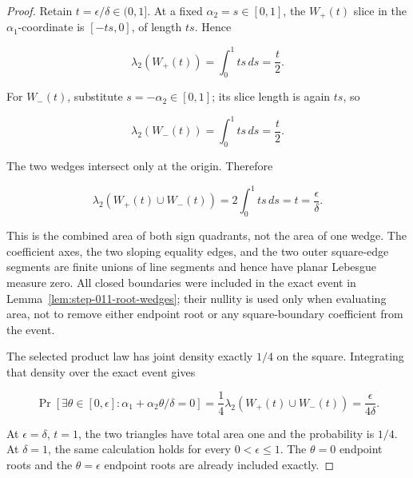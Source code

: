 \begin{proof}
Retain \(t=\epsilon/\delta\in(0,1]\). At a fixed
\(\alpha_2=s\in[0,1]\), the \(W_+(t)\) slice in the \(\alpha_1\)-coordinate is
\([-ts,0]\), of length \(ts\). Hence

\begin{equation}
\label{eq:appendix-display-362}
\lambda_2(W_+(t))
=\int_0^1 ts\,ds
=\frac t2.
\end{equation}

For \(W_-(t)\), substitute \(s=-\alpha_2\in[0,1]\); its slice length is again \(ts\), so

\begin{equation}
\label{eq:appendix-display-363}
\lambda_2(W_-(t))
=\int_0^1 ts\,ds
=\frac t2.
\end{equation}

The two wedges intersect only at the origin. Therefore

\begin{equation}
\label{eq:appendix-display-364}
\lambda_2(W_+(t)\cup W_-(t))
=2\int_0^1ts\,ds
=t
=\frac\epsilon\delta.
\end{equation}

This is the combined area of both sign quadrants, not the area of one wedge. The coefficient axes, the two
sloping equality edges, and the two outer square-edge segments are finite unions of line segments and hence
have planar Lebesgue measure zero. All closed boundaries were included in the exact event in
Lemma~\ref{lem:step-011-root-wedges}; their nullity is used only when evaluating area, not to remove either
endpoint root or any square-boundary coefficient from the event.

The selected product law has joint density exactly \(1/4\) on the square. Integrating that density over the
exact event gives

\begin{equation}
\label{eq:appendix-display-365}
\Pr[\exists\theta\in[0,\epsilon]:
\alpha_1+\alpha_2\theta/\delta=0]
=\frac14\lambda_2(W_+(t)\cup W_-(t))
=\frac{\epsilon}{4\delta}.
\end{equation}

At \(\epsilon=\delta\), \(t=1\), the two triangles have total area one and the probability is \(1/4\). At
\(\delta=1\), the same calculation holds for every \(0<\epsilon\leq1\). The \(\theta=0\) endpoint roots and
the \(\theta=\epsilon\) endpoint roots are already included exactly. 
\end{proof}

